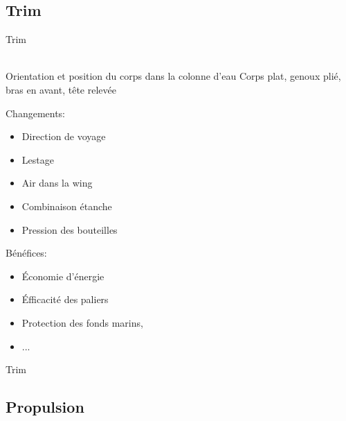 \subsection{Trim}

\begin{frame}{Trim}
	\begin{center}
		\resizebox{!}{18pt}{\strut\textbf{\insertsubsection}\strut}\\
		Orientation et position du corps dans la colonne d'eau
		\vfill
		Corps plat, genoux plié, bras en avant, tête relevée
	\end{center}
	\vfill
	\begin{multicols}{2}
		Changements:
		\begin{itemize}
			\item Direction de voyage
			\item Lestage
			\item Air dans la wing
			\item Combinaison étanche
			\item Pression des bouteilles
		\end{itemize}

		\columnbreak

		Bénéfices:
		\begin{itemize}
			\item Économie d'énergie
			\item Éfficacité des paliers
			\item Protection des fonds marins,
			\item ...
		\end{itemize}
	\end{multicols}
\end{frame}

\begin{frame}{Trim}  
\end{frame}

\subsection{Propulsion}

